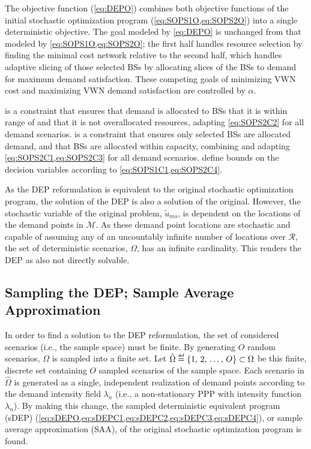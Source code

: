 \documentclass[12pt,dvipsnames]{report}
\newcommand\defeq{\mathrel{\overset{\makebox[0pt]{\mbox{\normalfont\tiny\sffamily def}}}{=}}}
\begin{document}
The objective function (\cref{eq:DEPO}) combines both objective functions of the initial stochastic optimization program (\cref{eq:SOPS1O,eq:SOPS2O}) into a single deterministic objective.  The goal modeled by \cref{eq:DEPO} is unchanged from that modeled by \cref{eq:SOPS1O,eq:SOPS2O}; the first half handles resource selection by finding the minimal cost network relative to the second half, which handles adaptive slicing of those selected BSs by allocating slices of the BSs to demand for maximum demand satisfaction.  These competing goals of minimizing VWN cost and maximizing VWN demand satisfaction are controlled by $\alpha$.

 is a constraint that ensures that demand is allocated to BSs that it is within range of and that it is not overallocated resources, adapting \cref{eq:SOPS2C2} for all demand scenarios.   is a constraint that ensures only selected BSs are allocated demand, and that BSs are allocated within capacity, combining and adapting \cref{eq:SOPS2C1,eq:SOPS2C3} for all demand scenarios.   define bounds on the decision variables according to \cref{eq:SOPS1C1,eq:SOPS2C4}.

As the DEP reformulation is equivalent to the original stochastic optimization program, the solution of the DEP is also a solution of the original.  However, the stochastic variable of the original problem, $\tilde{u}_{ms}$, is dependent on the locations of the demand points in $\mathcal{M}$.  As these demand point locations are stochastic and capable of assuming any of an uncountably infinite number of locations over $\mathcal{R}$, the set of deterministic scenarios, $\Omega$, has an infinite cardinality.  This renders the DEP as also not directly solvable.

\subsection{Sampling the DEP; Sample Average Approximation} \label{subsec:dep_sampling}

In order to find a solution to the DEP reformulation, the set of considered scenarios (i.e., the sample space) must be finite.  By generating $O$ random scenarios, $\Omega$ is sampled into a finite set.  Let $\hat{\Omega} \defeq \left\{ 1,\, 2,\, \ldots,\, O \right\} \subset \Omega$ be this finite, discrete set containing $O$ sampled scenarios of the sample space.  Each scenario in $\hat{\Omega}$ is generated as a single, independent realization of demand points according to the demand intensity field $\lambda_n$ (i.e., a non-stationary PPP with intensity function $\lambda_n$).  By making this change, the sampled deterministic equivalent program (sDEP) (\cref{eq:sDEPO,eq:sDEPC1,eq:sDEPC2,eq:sDEPC3,eq:sDEPC4}), or sample average approximation (SAA), of the original stochastic optimization program is found.
\end{document}

